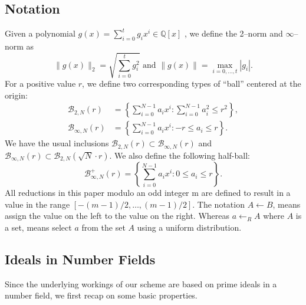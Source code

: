 \documentclass[a4paper, 12pt]{article}
\newcommand{\ndash}{\nobreakdash --}
\begin{document}
	\subsection{Notation}
	
	Given a polynomial $g(x)=\sum_{i=0}^{t}{g_i x^i} \in \mathbb{Q}[x]$ , we define the 2\ndash norm and $\infty$\ndash norm as
	\[
		\|g(x)\|_2 = \sqrt{\sum_{i=0}^{t}{g_i^2}} \text{ and } \|g(x)\|=\max_{i=0, \dots, t} |g_i|.
	\] %
	For a positive value $r$, we define two corresponding types of “ball” centered at	the origin:
	\begin{align*}
		\mathcal{B}_{2,N}(r)&=\left\{ \sum_{i=0}^{N-1}{a_i x^i} : \sum_{i=0}^{N-1}{a_i^2 \le r^2} \right\},\\
		\mathcal{B}_{\infty,N}(r)&=\left\{ \sum_{i=0}^{N-1}{a_i x^i} : {-r \le a_i \le r} \right\}.
	\end{align*}
	We have the usual inclusions $\mathcal{B}_{2,N}(r) \subset \mathcal{B}_{\infty,N}(r)$ and $\mathcal{B}_{\infty,N}(r) \subset \mathcal{B}_{2,N}(\sqrt{N} \cdot r)$.
	We also define the following half-ball:
	\[
		\mathcal{B}_{\infty,N}^{+}(r)=\left\{ \sum_{i=0}^{N-1}{a_i x^i} : {0 \le a_i \le r} \right\}.
	\] %
	All reductions in this paper modulo an odd integer m are defined to result in a value in the range $[−(m - 1)/2,\ldots, (m − 1)/2]$. The notation $A\leftarrow B$, means assign the value on the left to the value on the right. Whereas $a \leftarrow _R A$ where $A$ is a set, means select $a$ from the set $A$ using a uniform distribution.
	
	\subsection{Ideals in Number Fields}
	
	Since the underlying workings of our scheme are based on prime ideals in a number field, we first recap on some basic properties.
	
	\newcommand{\bb}[1]{\mathbb{#1}}
	\newcommand{\mc}[1]{\mathcal{#1}}
	
\end{document}
